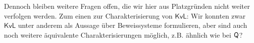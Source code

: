 



Dennoch bleiben weitere Fragen offen, die wir hier aus Platzgründen nicht weiter verfolgen werden. 
Zum einen zur Charakterisierung von $\mathsf{KvL}$:
Wir konnten zwar $\mathsf{KvL}$ unter anderem als Aussage über Beweissysteme formulieren, aber sind auch noch weitere äquivalente Charakterisierungen möglich, z.B. ähnlich wie bei $\mathsf{Q}$?

